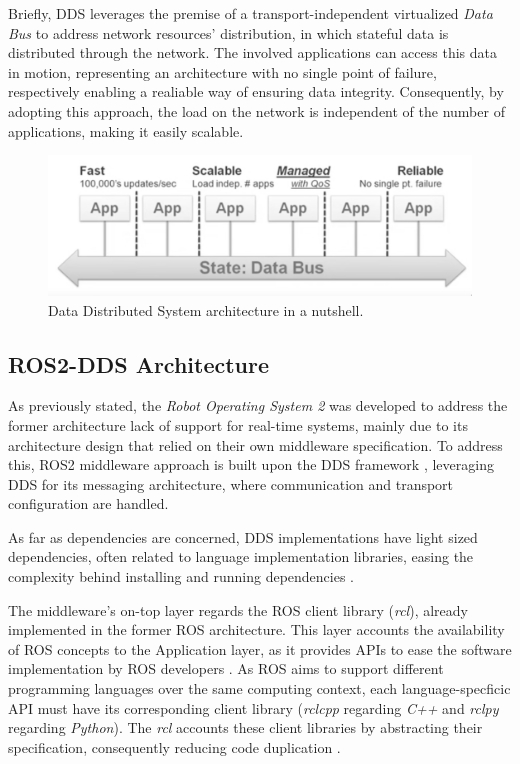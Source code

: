 Briefly, DDS leverages the premise of a transport-independent virtualized \textit{Data Bus} to address network resources' distribution, in which stateful data is distributed through the network. The involved applications can access this data in motion, representing an architecture with no single point of failure, respectively enabling a realiable way of ensuring data integrity. Consequently, by adopting this approach, the load on the network is independent of the number of applications, making it easily scalable.

\begin{figure}[H]
    \centering
    \includegraphics[width=0.6\linewidth]{img/dds-architecture.png}
    \caption{Data Distributed System architecture in a nutshell.}
    \label{fig:dds-architecture-nutshell}
\end{figure}


\subsection{ROS2-DDS Architecture}

As previously stated, the \textit{Robot Operating System 2} was developed to address the former architecture lack of support for real-time systems, mainly due to its architecture design that relied on their own middleware specification. To address this, ROS2 middleware approach is built upon the DDS framework \cite{maruyama2016exploring}, leveraging DDS for its messaging architecture, where communication and transport configuration are handled. 

As far as dependencies are concerned, DDS implementations have light sized dependencies, often related to language implementation libraries, easing the complexity behind installing and running dependencies \cite{ros-on-dds}.

The middleware's on-top layer regards the ROS client library (\textit{rcl}), already implemented in the former ROS architecture. This layer accounts the availability of ROS concepts to the Application layer, as it provides APIs to ease the software implementation by ROS developers \cite{ros2documentation}. As ROS aims to support different programming languages over the same computing context, each language-specficic API must have its corresponding client library (\textit{rclcpp} regarding \textit{C++} and \textit{rclpy} regarding \textit{Python}). The \textit{rcl} accounts these client libraries by abstracting their specification, consequently reducing code duplication \cite{rcl, casini2019response}.


